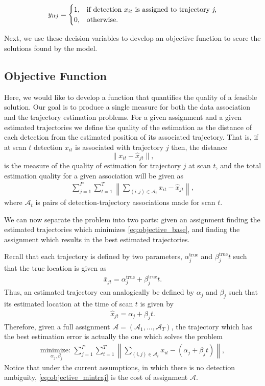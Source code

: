 \begin{align}
y_{itj} =
\begin{cases}
1, & \text{if detection $x_{it}$ is assigned to trajectory \textit{j},} \\
0, & \text{otherwise.}
\end{cases}
\end{align}

Next, we use these decision variables to develop an objective function to score the solutions found by the model. 

\subsection{Objective Function}
Here, we would like to develop a function that quantifies the quality of a feasible solution. Our goal is to produce a single measure for both the data association and the trajectory estimation problems. For a given assignment and a given estimated trajectories we define the quality of the estimation as the distance of each detection from the estimated position of its associated trajectory. That is, if at scan $t$ detection $x_{it}$ is associated with trajectory $j$ then, the distance 
$$\|x_{it}-\hat{x}_{jt}\|,$$
is the measure of the quality of estimation for trajectory $j$ at scan $t$, and the total estimation quality for a given association will be given as 
\begin{align}\label{eq:objective_base}
\sum_{j=1}^P\sum_{t=1}^T\left\|\sum_{(i,j)\in \mathcal{A}_{t}} x_{it} - \hat{x}_{jt}\right\|,
\end{align} 
where $\mathcal{A}_t$ is pairs of detection-trajectory associations made for scan $t$. 

We can now separate the problem into two parts: given an assignment finding the estimated trajectories which minimizes \eqref{eq:objective_base}, and finding the assignment which results in the best estimated trajectories.

Recall that each trajectory is defined by two parameters, $\alpha^{\text{true}}_{j}$ and $\beta^{\text{true}}_{j}t$ such that the true location is given as 
\begin{align}
	\bar{x}_{jt} = \alpha^{\text{true}}_{j} + \beta^{\text{true}}_{j}t.
\end{align}
Thus, an estimated trajectory can analogically be defined by  $\alpha_{j}$ and $\beta_{j}$ such that its estimated location at the time of scan $t$ is given by
\begin{align}
	\hat{x}_{jt} =  \alpha_{j} + \beta_{j}t.
\end{align}
Therefore, given a full assignment  $\mathcal{A}=(\mathcal{A}_1,\ldots,\mathcal{A}_T)$, the trajectory which has the best estimation error is actually the one which solves the problem
\begin{align}\label{eq:objective_mintraj}
\underset{\alpha_{j}, \beta_{j}}{\text{minimize: }}\sum_{j=1}^P\sum_{t=1}^T\left\|\sum_{(i,j)\in \mathcal{A}_{t}} x_{it} - (\alpha_{j} + \beta_{j}t)\right\|,
\end{align} 
Notice that under the current assumptions, in which there is no detection ambiguity, \eqref{eq:objective_mintraj} is the cost of assignment $\mathcal{A}$. 

